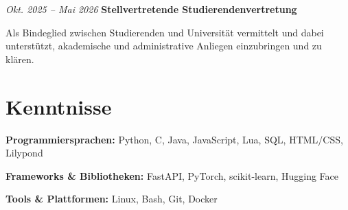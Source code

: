 \documentclass[german]{cv}
\begin{document}
        \vspace{0.13 cm}

        \begin{twocolentry}{
        \textit{Okt. 2025 – Mai 2026}}
            \textbf{Stellvertretende Studierendenvertretung}
        \end{twocolentry}

        \vspace{0.10 cm}
        \begin{onecolentry}
            \begin{highlights}
                \item Als Bindeglied zwischen Studierenden und Universität vermittelt und dabei unterstützt, akademische und administrative Anliegen einzubringen und zu klären.
            \end{highlights}
        \end{onecolentry}

    \section{Kenntnisse}

        \begin{onecolentry}
            \textbf{Programmiersprachen:} Python, C, Java, JavaScript, Lua, SQL, HTML/CSS, Lilypond
        \end{onecolentry}

        \vspace{0.13 cm}

        \begin{onecolentry}
            \textbf{Frameworks \& Bibliotheken:} FastAPI, PyTorch, scikit-learn, Hugging Face
        \end{onecolentry}

        \vspace{0.13 cm}

        \begin{onecolentry}
            \textbf{Tools \& Plattformen:} Linux, Bash, Git, Docker
        \end{onecolentry}
\end{document}
